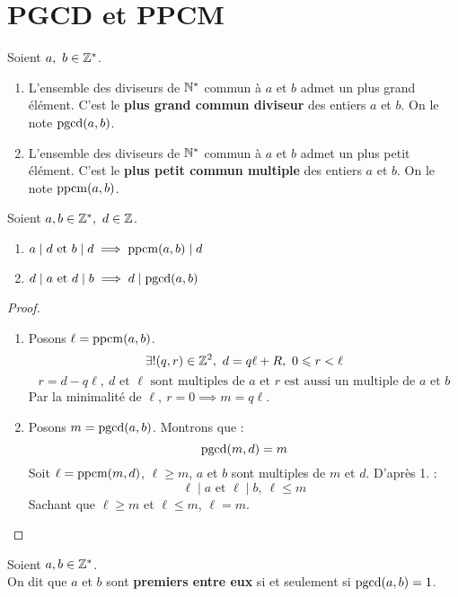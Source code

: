 \section{PGCD et PPCM}

\begin{definition}
	Soient $a,\ b \in \mathbb{Z}^*$. 
	\begin{enumerate}
		\item L'ensemble des diviseurs de $\mathbb{N}^*$ commun à $a$ et $b$ admet un plus grand élément. C'est le \textbf{plus grand commun diviseur} des entiers $a$ et $b$. On le note $\operatorname{pgcd}(a, b)$.
		\item L'ensemble des diviseurs de $\mathbb{N}^*$ commun à $a$ et $b$ admet un plus petit élément. C'est le \textbf{plus petit commun multiple} des entiers $a$ et $b$. On le note $\operatorname{ppcm}(a, b)$.
	\end{enumerate}
\end{definition}

\begin{theorem}
	Soient $a, b \in \mathbb{Z}^*,\ d \in \mathbb{Z}$.
	\begin{enumerate}
		\item $a \mid d \text{ et } b \mid d \implies \operatorname{ppcm}(a, b) \mid d$
		\item $d \mid a \text{ et } d \mid b \implies d \mid \operatorname{pgcd}(a, b)$
	\end{enumerate}
\end{theorem}

\begin{proof}
	\leavevmode
	\begin{enumerate}
		\item Posons $\ell = \operatorname{ppcm}(a,b)$. 
		\[ \exists ! (q,r) \in \Z^2,\ d = q \ell + R,\ 0 \leq r < \ell \]
		\[ r = d - q \ell,\ d \text{ et } \ell \text{ sont multiples de } a \text{ et } r \text{ est aussi un multiple de } a \text{ et } b \]
		Par la minimalité de $\ell,\ r = 0 \implies m = q \ell$.
		\item Posons $m = \operatorname{pgcd}(a, b)$. Montrons que :
		\[ \operatorname{pgcd}(m, d) = m \]
		Soit $\ell = \operatorname{ppcm}(m,d)$, $\ell \geq m$, $a$ et $b$ sont multiples de $m$ et $d$. D'après 1. :
		\[ \ell \mid a \text{ et } \ell \mid b,\ \ell \leq m \]
		Sachant que $\ell \geq m$ et $\ell \leq m$, $\ell = m$.
	\end{enumerate}
\end{proof}

\begin{definition}
	Soient $a, b \in \mathbb{Z}^*$. 
	\\	
	On dit que $a$ et $b$ sont \textbf{premiers entre eux} si et seulement si $\operatorname{pgcd}(a, b) = 1$.
\end{definition}

